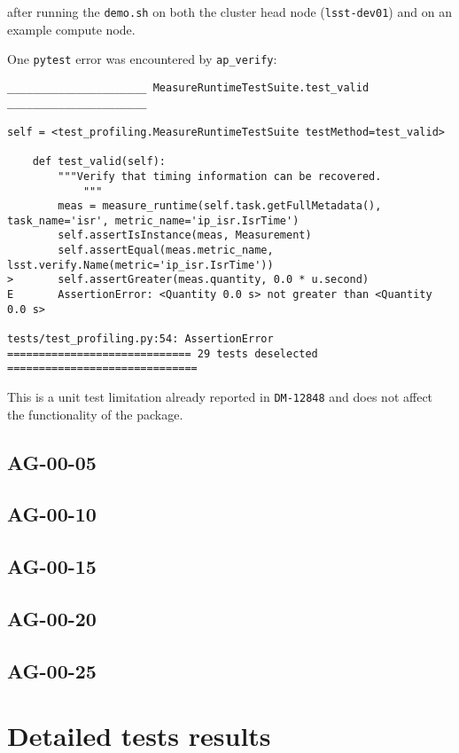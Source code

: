 \documentclass[DM,lsstdraft,STR,toc]{lsstdoc}
\begin{document}
after running the \texttt{demo.sh} on both the cluster head node (\texttt{lsst-dev01}) and on an example compute node.

One \texttt{pytest} error was encountered by \texttt{ap\_verify}:

\begin{verbatim}
______________________ MeasureRuntimeTestSuite.test_valid ______________________

self = <test_profiling.MeasureRuntimeTestSuite testMethod=test_valid>

    def test_valid(self):
        """Verify that timing information can be recovered.
            """
        meas = measure_runtime(self.task.getFullMetadata(), task_name='isr', metric_name='ip_isr.IsrTime')
        self.assertIsInstance(meas, Measurement)
        self.assertEqual(meas.metric_name, lsst.verify.Name(metric='ip_isr.IsrTime'))
>       self.assertGreater(meas.quantity, 0.0 * u.second)
E       AssertionError: <Quantity 0.0 s> not greater than <Quantity 0.0 s>

tests/test_profiling.py:54: AssertionError
============================= 29 tests deselected ==============================\end{verbatim}

This is a unit test limitation already reported 
in \texttt{DM-12848} and does not affect the functionality of the package.

\subsection{AG-00-05}
\subsection{AG-00-10}
\subsection{AG-00-15}
\subsection{AG-00-20}
\subsection{AG-00-25}

\appendix

\newpage
\section{Detailed tests results}
\end{document}
